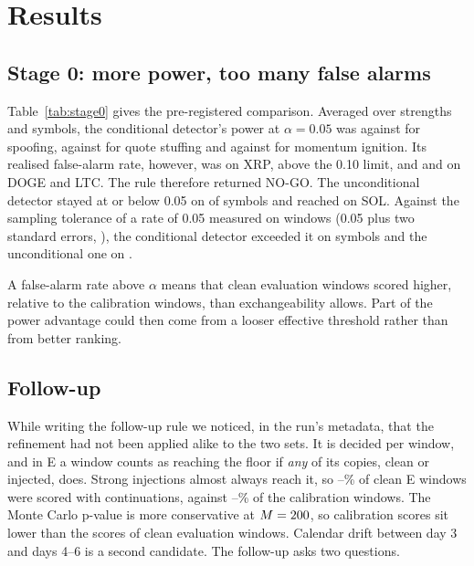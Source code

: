 \documentclass[journal]{IEEEtran}
\begin{document}
\section{Results}
\label{sec:results}

\subsection{Stage 0: more power, too many false alarms}
Table~\ref{tab:stage0} gives the pre-registered comparison. Averaged over strengths and symbols, the conditional
detector's power at $\alpha=0.05$ was \powGenSpoof{} against \powUncSpoof{} for spoofing, \powGenStuff{} against
\powUncStuff{} for quote stuffing and \powGenIgnit{} against \powUncIgnit{} for momentum ignition. Its realised
false-alarm rate, however, was \faGenXrp{} on XRP, above the 0.10 limit, and \faGenDoge{} and \faGenLtc{} on DOGE
and LTC. The rule therefore returned NO-GO. The unconditional detector stayed at or below 0.05 on \faUncAtMostNominal{} of
\nSymbols{} symbols and reached \faUncSol{} on SOL. Against the sampling tolerance of a rate of 0.05 measured on
\nEval{} windows (0.05 plus two standard errors, \faTwoSE), the conditional detector exceeded it on
\faGenAboveTwoSE{} symbols and the unconditional one on \faUncAboveTwoSE.

\begin{table}[t]
\centering
\caption{Stage 0: power at $\alpha=0.05$, averaged over each family's strength grid, and the realised false-alarm
rate on clean evaluation windows. Cond.: generator-conditional null; uncond.: unconditional null.}
\label{tab:stage0}
\setlength{\tabcolsep}{3pt}
\resizebox{\columnwidth}{!}{}
\end{table}

A false-alarm rate above $\alpha$ means that clean evaluation windows scored higher, relative to the calibration
windows, than exchangeability allows. Part of the power advantage could then come from a looser effective
threshold rather than from better ranking.

\subsection{Follow-up}
\label{sec:followup}
While writing the follow-up rule we noticed, in the run's metadata, that the refinement had not been applied
alike to the two sets. It is decided per window, and in E a window counts as reaching the floor if \emph{any}
of its copies, clean or injected, does. Strong injections almost always reach it, so --\% of clean E
windows were scored with \Mrefine{} continuations, against --\% of the calibration
windows. The Monte Carlo p-value is more conservative at $M=200$, so calibration scores sit lower than the
scores of clean evaluation windows. Calendar drift between day 3 and days 4--6 is a second candidate. The
follow-up asks two questions.
\end{document}
